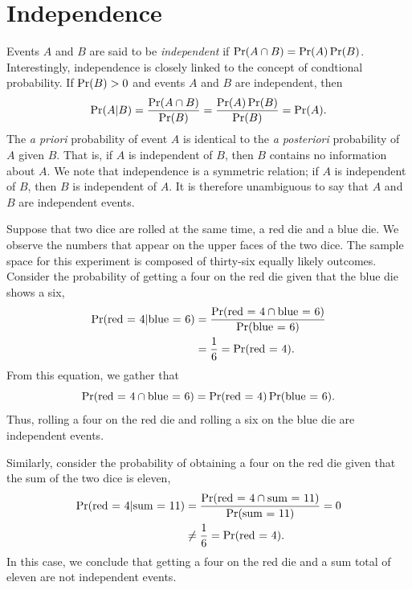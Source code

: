 \section{Independence}
\label{section:Independence}
Events $A$ and $B$ are said to be \emph{independent} if $\Pr (A \cap B) = \Pr(A) \Pr(B)$.
Interestingly, independence is closely linked to the concept of condtional probability.
If $\Pr(B) > 0$ and events $A$ and $B$ are independent, then
\begin{equation*}
\Pr (A | B) = \frac{ \Pr (A \cap B) }{\Pr (B)}
= \frac{ \Pr (A) \Pr(B) }{\Pr (B)}
= \Pr (A).
\end{equation*}
The \emph{a priori} probability of event $A$ is identical to the \emph{a posteriori} probability of $A$ given $B$.
That is, if $A$ is independent of $B$, then $B$ contains no information about $A$.
We note that independence is a symmetric relation; if $A$ is independent of $B$, then $B$ is independent of $A$.
It is therefore unambiguous to say that $A$ and $B$ are independent events.

\begin{example}
Suppose that two dice are rolled at the same time, a red die and a blue die.
We observe the numbers that appear on the upper faces of the two dice.
The sample space for this experiment is composed of thirty-six equally likely outcomes.
Consider the probability of getting a four on the red die given that the blue die shows a six,
\begin{equation*}
\begin{split}
\Pr (\text{red = 4} | \text{blue = 6})
&= \frac{ \Pr (\text{red = 4} \cap \text{blue = 6}) }
{ \Pr (\text{blue = 6}) } \\
&= \frac{1}{6} = \Pr (\text{red = 4}) .
\end{split}
\end{equation*}
From this equation, we gather that
\begin{equation*}
\Pr (\text{red = 4} \cap \text{blue = 6})
= \Pr (\text{red = 4}) \Pr (\text{blue = 6}) .
\end{equation*}
Thus, rolling a four on the red die and rolling a six on the blue die are independent events.

Similarly, consider the probability of obtaining a four on the red die given that the sum of the two dice is eleven,
\begin{equation*}
\begin{split}
\Pr (\text{red = 4} | \text{sum = 11})
&= \frac{ \Pr (\text{red = 4} \cap \text{sum = 11}) }
{ \Pr (\text{sum = 11}) } = 0 \\
&\neq \frac{1}{6} = \Pr (\text{red = 4}) .
\end{split}
\end{equation*}
In this case, we conclude that getting a four on the red die and a sum total of eleven are not independent events.
\end{example}

